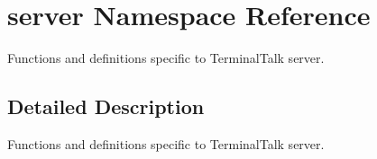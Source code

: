 \hypertarget{namespaceserver}{}\section{server Namespace Reference}
\label{namespaceserver}


Functions and definitions specific to Terminal\+Talk server.  




\subsection{Detailed Description}
Functions and definitions specific to Terminal\+Talk server. 